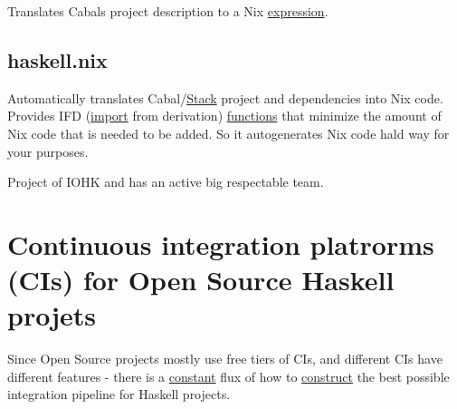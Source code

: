 \documentclass[a4paper,14pt,oneside]{book}
\begin{document}
Translates Cabals project description to a Nix \hyperref[orgbe3746b]{expression}.

\section{haskell.nix}
\label{sec:orgc9f79dd}

Automatically translates Cabal/\hyperref[orgaf1e197]{Stack} project and dependencies into Nix code. Provides IFD (\hyperref[orgec51cbb]{import} from derivation) \hyperref[orge13d971]{functions} that minimize the amount of Nix code that is needed to be added.
So it autogenerates Nix code hald way for your purposes.

Project of IOHK and has an active big respectable team.

\chapter{Continuous integration platrorms (CIs) for Open Source Haskell projets}
\label{sec:org1f09cc7}

Since Open Source projects mostly use free tiers of CIs, and different CIs have different features - there is a \hyperref[orgc2bd9ca]{constant} flux of how to \hyperref[org078505a]{construct} the best possible integration pipeline for Haskell projects.
\end{document}
